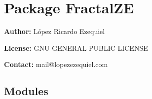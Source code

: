 %
%
%


\section{Package FractalZE}

    \label{FractalZE}
\textbf{Author:} López Ricardo Ezequiel



\textbf{License:} GNU GENERAL PUBLIC LICENSE



\textbf{Contact:} mail@lopezezequiel.com





\subsection{Modules}

